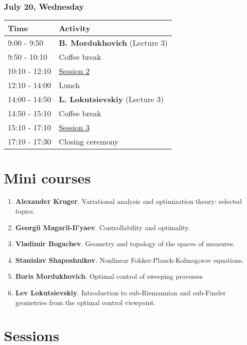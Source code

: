 \documentclass[
]{article}
\providecommand{\tightlist}{%
  \setlength{\itemsep}{0pt}\setlength{\parskip}{0pt}}
\begin{document}
\hypertarget{july-20-wednesday}{%
\subsubsection{July 20, Wednesday}\label{july-20-wednesday}}

\begin{longtable}[]{@{}ll@{}}
\toprule()
Time & Activity \\
\midrule()
\endhead
9:00 - 9:50 & \textbf{B. Mordukhovich} (Lecture 3) \\
9:50 - 10:10 & Coffee break \\
10:10 - 12:10 & \protect\hyperlink{se}{Session 2} \\
12:10 - 14:00 & Lunch \\
14:00 - 14:50 & \textbf{L. Lokutsievskiy} (Lecture 3) \\
14:50 - 15:10 & Coffee break \\
15:10 - 17:10 & \protect\hyperlink{se}{Session 3} \\
17:10 - 17:30 & Closing ceremony \\
\bottomrule()
\end{longtable}

\hypertarget{mini-courses}{%
\section{Mini courses}\label{mini-courses}}

\begin{enumerate}
\def\labelenumi{\arabic{enumi}.}
\tightlist
\item
  \textbf{Alexander Kruger}. Variational analysis and optimization
  theory: selected topics.
\item
  \textbf{Georgii Magaril-Il'yaev}. Controllability and optimality.
\item
  \textbf{Vladimir Bogachev}. Geometry and topology of the spaces of
  measures.
\item
  \textbf{Stanislav Shaposhnikov}. Nonlinear Fokker-Planck-Kolmogorov
  equations.
\item
  \textbf{Boris Mordukhovich}. Optimal control of sweeping processes
\item
  \textbf{Lev Lokutsievskiy}. Introduction to sub-Riemannian and
  sub-Finsler geometries from the optimal control viewpoint. \newpage
\end{enumerate}

\hypertarget{se}{%
\section{Sessions}\label{se}}
\end{document}
